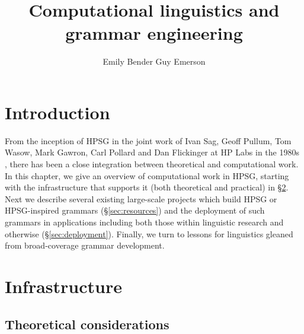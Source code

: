 \documentclass[output=paper]{langsci/langscibook}
\author{%
	Emily Bender\affiliation{University of Washington}
	\lastand Guy Emerson\affiliation{University of Cambridge}
}
\title{Computational linguistics and grammar engineering}
\begin{document}


\section{Introduction}


From the inception of HPSG in the joint work of Ivan Sag, Geoff Pullum, Tom Wasow, Mark Gawron, Carl Pollard and Dan Flickinger at HP Labs in the 1980s \cite{FIXME-CLobit-or-other}, there has been a close integration between theoretical and computational work. In this chapter, we give an overview of computational work in HPSG, starting with the infrastructure that supports it (both theoretical and practical) in \S\ref{sec:infrastructure}. Next we describe several existing large-scale projects which build HPSG or HPSG-inspired grammars (\S\ref{sec:resources}) and the deployment of such grammars in applications including both those within linguistic research and otherwise (\S\ref{sec:deployment}).  Finally, we turn to lessons for linguistics gleaned from broad-coverage grammar development.



\section{Infrastructure}
\label{sec:infrastructure}


\subsection{Theoretical considerations}
\label{sec:theoretical}
\end{document}
